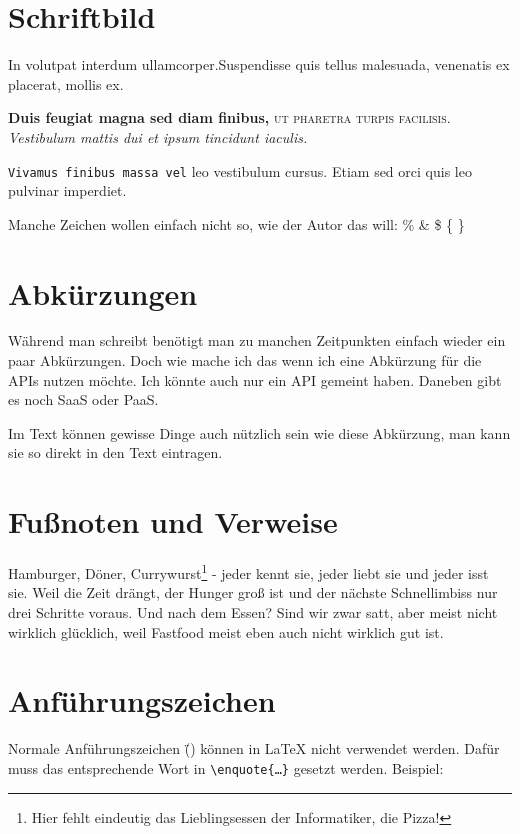 \section{Schriftbild}

\LARGE In volutpat interdum ullamcorper.\small Suspendisse quis tellus malesuada, venenatis ex placerat, mollis ex.
\normalsize

\textbf{Duis feugiat magna sed diam finibus,} \textsc{ut pharetra turpis facilisis.} \textit{Vestibulum mattis dui et ipsum tincidunt iaculis.}

\texttt{Vivamus finibus massa vel} \textsf{leo vestibulum cursus.} \textrm{Etiam sed orci quis leo pulvinar imperdiet.}

Manche Zeichen wollen einfach nicht so, wie der Autor das will: \% \& \$ \{ \}

\section{Abkürzungen}

Während man schreibt benötigt man zu manchen Zeitpunkten einfach wieder ein paar Abkürzungen. Doch wie mache ich das wenn ich eine Abkürzung für die \acp{API} nutzen möchte. Ich könnte auch nur ein \ac{API} gemeint haben. Daneben gibt es noch \ac{SaaS} oder \ac{PaaS}.

Im Text können gewisse Dinge auch nützlich sein wie \zB diese Abkürzung, \dash man kann sie so direkt in den Text eintragen.

\section{Fußnoten und Verweise}

Hamburger, Döner, Currywurst\footnote{Hier fehlt eindeutig das Lieblingsessen der Informatiker, die Pizza!} - jeder kennt sie, jeder liebt sie und jeder isst sie. Weil die Zeit drängt, der Hunger groß ist und der nächste Schnellimbiss nur drei Schritte voraus. Und nach dem Essen? Sind wir zwar satt, aber meist nicht wirklich glücklich, weil Fastfood meist eben auch nicht wirklich gut ist.\cite{Forslin.2013}

\section{Anführungszeichen}

Normale Anführungszeichen (\"{}) können in \LaTeX{} nicht verwendet werden. Dafür muss das entsprechende Wort in \texttt{\textbackslash enquote{\{\ldots\}}} gesetzt werden. Beispiel:


